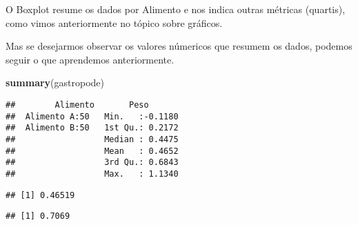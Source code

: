 \documentclass[]{book}
\newenvironment{Shaded}{\begin{snugshade}}{\end{snugshade}}
\newcommand{\KeywordTok}[1]{\textcolor[rgb]{0.13,0.29,0.53}{\textbf{#1}}}
\newcommand{\NormalTok}[1]{#1}
\newcommand{\OperatorTok}[1]{\textcolor[rgb]{0.81,0.36,0.00}{\textbf{#1}}}
\newcommand{\StringTok}[1]{\textcolor[rgb]{0.31,0.60,0.02}{#1}}
\begin{document}
O Boxplot resume os dados por Alimento e nos indica outras métricas (quartis), como vimos anteriormente no tópico sobre gráficos.

Mas se desejarmos observar os valores númericos que resumem os dados, podemos seguir o que aprendemos anteriormente.

\begin{Shaded}
\begin{Highlighting}[]
\KeywordTok{summary}\NormalTok{(gastropode)}
\end{Highlighting}
\end{Shaded}

\begin{verbatim}
##        Alimento       Peso        
##  Alimento A:50   Min.   :-0.1180  
##  Alimento B:50   1st Qu.: 0.2172  
##                  Median : 0.4475  
##                  Mean   : 0.4652  
##                  3rd Qu.: 0.6843  
##                  Max.   : 1.1340
\end{verbatim}

\begin{Shaded}
\end{Shaded}

\begin{verbatim}
## [1] 0.46519
\end{verbatim}

\begin{Shaded}
\end{Shaded}

\begin{verbatim}
## [1] 0.7069
\end{verbatim}

\begin{Shaded}
\end{Shaded}
\end{document}
